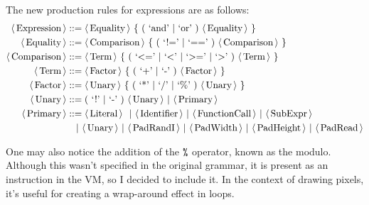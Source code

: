 The new production rules for expressions are as follows:
\begin{align*}
    \langle\, \text{Expression}\, \rangle & ::= \langle\, \text{Equality}\, \rangle \ \{ \ ( \ \text{`and'} \ |\  \text{`or'} \ )\ \langle\, \text{Equality}\, \rangle \ \}                                 \\
    \langle\, \text{Equality}\, \rangle   & ::= \langle\, \text{Comparison}\, \rangle \ \{ \ ( \ \text{`!='} \ |\  \text{`=='} \ )\  \langle\, \text{Comparison}\, \rangle \ \}                             \\
    \langle\, \text{Comparison}\, \rangle & ::= \langle\, \text{Term}\, \rangle \ \{ \ ( \ \text{`<='} \ |\  \text{`<'} \ |\  \text{`>='} \ |\  \text{`>'} \ )\  \langle\, \text{Term}\, \rangle  \ \}      \\
    \langle\, \text{Term}\, \rangle       & ::= \langle\, \text{Factor}\, \rangle \ \{ \ ( \ \text{`+'} \ |\  \text{`-'} \ )\ \langle\, \text{Factor}\, \rangle \ \}                                        \\
    \langle\, \text{Factor}\, \rangle     & ::= \langle\, \text{Unary}\, \rangle \ \{ \ ( \ \text{`*'} \ |\  \text{`/'} \ |\ \text{`\%'} \ )\ \langle\, \text{Unary}\, \rangle \ \}                         \\
    \langle\, \text{Unary}\, \rangle      & ::=  ( \ \text{`!'} \ |\  \text{`-'} \ ) \ \langle\, \text{Unary}\, \rangle \ |\ \langle\, \text{Primary}\, \rangle                                             \\
    \langle\, \text{Primary}\, \rangle    & ::= \langle\, \text{Literal}\, \rangle \ \ |\
    \langle\, \text{Identifier}\, \rangle \ |\ \langle\, \text{FunctionCall}\, \rangle \ |\ \langle\, \text{SubExpr}\, \rangle
    \                                                                                                                                                    \\
                         & \quad | \ \langle\, \text{Unary}\, \rangle \ | \ \langle\, \text{PadRandI}\, \rangle \ | \ \langle\, \text{PadWidth}\, \rangle \ | \ \langle\, \text{PadHeight}\, \rangle \ | \ \langle\, \text{PadRead}\, \rangle
\end{align*}

One may also notice the addition of the $\texttt{\%}$ operator, known as the
modulo.  Although this wasn't specified in the original grammar, it is present
as an instruction in the VM, so I decided to include it. In the context of
drawing pixels, it's useful for creating a wrap-around effect in loops.

